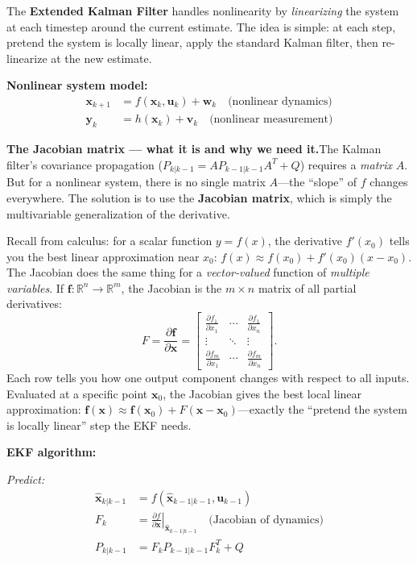 The \textbf{Extended Kalman Filter} handles nonlinearity by \textit{linearizing} the system at each timestep around the current estimate. The idea is simple: at each step, pretend the system is locally linear, apply the standard Kalman filter, then re-linearize at the new estimate.

\textbf{Nonlinear system model:}
\begin{align}
\mathbf{x}_{k+1} &= f(\mathbf{x}_k, \mathbf{u}_k) + \mathbf{w}_k \quad \text{(nonlinear dynamics)} \\
\mathbf{y}_k &= h(\mathbf{x}_k) + \mathbf{v}_k \quad \text{(nonlinear measurement)}
\end{align}

\textbf{The Jacobian matrix --- what it is and why we need it.}\;The Kalman filter's covariance propagation ($P_{k|k-1} = A P_{k-1|k-1} A^T + Q$) requires a \emph{matrix} $A$. But for a nonlinear system, there is no single matrix $A$---the ``slope'' of $f$ changes everywhere. The solution is to use the \textbf{Jacobian matrix}, which is simply the multivariable generalization of the derivative.

Recall from calculus: for a scalar function $y = f(x)$, the derivative $f'(x_0)$ tells you the best linear approximation near $x_0$: $f(x) \approx f(x_0) + f'(x_0)(x - x_0)$. The Jacobian does the same thing for a \emph{vector-valued} function of \emph{multiple variables}. If $\mathbf{f}: \mathbb{R}^n \to \mathbb{R}^m$, the Jacobian is the $m \times n$ matrix of all partial derivatives:
\[
F = \frac{\partial \mathbf{f}}{\partial \mathbf{x}} = \begin{bmatrix}
\frac{\partial f_1}{\partial x_1} & \cdots & \frac{\partial f_1}{\partial x_n} \\
\vdots & \ddots & \vdots \\
\frac{\partial f_m}{\partial x_1} & \cdots & \frac{\partial f_m}{\partial x_n}
\end{bmatrix}.
\]
Each row tells you how one output component changes with respect to all inputs. Evaluated at a specific point $\mathbf{x}_0$, the Jacobian gives the best local linear approximation: $\mathbf{f}(\mathbf{x}) \approx \mathbf{f}(\mathbf{x}_0) + F(\mathbf{x} - \mathbf{x}_0)$---exactly the ``pretend the system is locally linear'' step the EKF needs.

\textbf{EKF algorithm:}

\textit{Predict:}
\begin{align}
\hat{\mathbf{x}}_{k|k-1} &= f(\hat{\mathbf{x}}_{k-1|k-1}, \mathbf{u}_{k-1}) \\
F_k &= \left.\frac{\partial f}{\partial \mathbf{x}}\right|_{\hat{\mathbf{x}}_{k-1|k-1}} \quad \text{(Jacobian of dynamics)} \\
P_{k|k-1} &= F_k P_{k-1|k-1} F_k^T + Q
\end{align}

